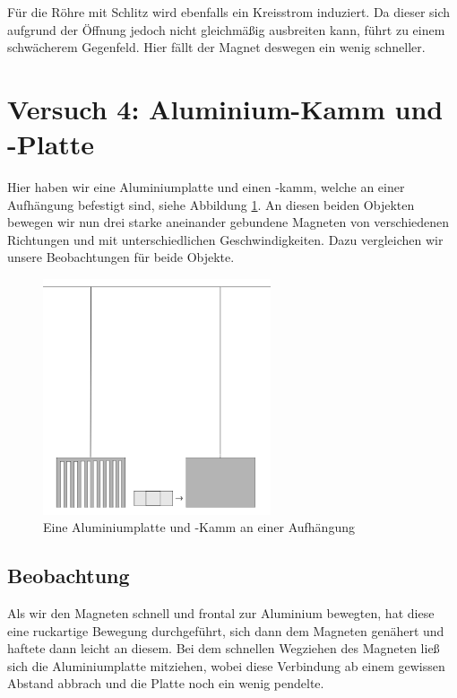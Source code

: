 \documentclass[11pt,a4paper,titlepage, ngerman]{article}
\begin{document}
			Für die Röhre mit Schlitz wird ebenfalls ein Kreisstrom induziert. Da dieser sich aufgrund der Öffnung jedoch nicht gleichmäßig ausbreiten kann, führt zu einem schwächerem Gegenfeld. Hier fällt der Magnet deswegen ein wenig schneller.		
					
	\section{Versuch 4: Aluminium-Kamm und -Platte} 
	
		Hier haben wir eine Aluminiumplatte und einen -kamm, welche an einer Aufhängung befestigt sind, siehe Abbildung \ref{}. An diesen beiden Objekten bewegen wir nun drei starke aneinander gebundene Magneten von verschiedenen Richtungen und mit unterschiedlichen Geschwindigkeiten.
		Dazu vergleichen wir unsere Beobachtungen für beide Objekte.
		
		\begin{figure}
			\centering
			\includegraphics[width=0.6\textwidth]{Alu-Platte.png}
			\caption{Eine Aluminiumplatte und -Kamm an einer Aufhängung} 
			\label{fig:Aluplatte}
		\end{figure}
		
		\subsection*{Beobachtung}
		
			Als wir den Magneten schnell und frontal zur Aluminium bewegten, hat diese eine ruckartige Bewegung durchgeführt, sich dann dem Magneten genähert und haftete dann leicht an diesem. Bei dem schnellen Wegziehen des Magneten ließ sich die Aluminiumplatte mitziehen, wobei diese Verbindung ab einem gewissen Abstand abbrach und die Platte noch ein wenig pendelte. 
			
\end{document}

